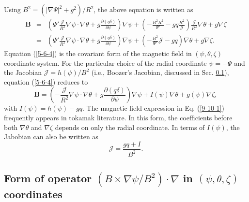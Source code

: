 \documentclass{llncs}
\begin{document}
Using $B^2 = (| \nabla \Psi |^2 + g^2) / R^2$, the above equation is written
as
\begin{eqnarray}
  \mathbf{B} & = & \left( \Psi' \frac{\mathcal{J}}{R^2} \nabla \psi \cdot
  \nabla \theta + g \frac{\partial (q \delta)}{\partial \psi} \right) \nabla
  \psi + \left( - \frac{B^2 R^2}{\Psi'} - g q \frac{R^2}{\mathcal{J}} \right)
  \frac{\mathcal{J}}{R^2} \nabla \theta + g \nabla \zeta \nonumber\\
  & = & \left( \Psi' \frac{\mathcal{J}}{R^2} \nabla \psi \cdot \nabla \theta
  + g \frac{\partial (q \delta)}{\partial \psi} \right) \nabla \psi + \left( -
  \frac{B^2}{\Psi'} \mathcal{J}- g q \right) \nabla \theta + g \nabla \zeta . 
  \label{5-6-4}
\end{eqnarray}
Equation (\ref{5-6-4}) is the covariant form of the magnetic field in $(\psi,
\theta, \zeta)$ coordinate system. For the particular choice of the radial
coordinate $\psi = - \Psi$ and the Jacobian $\mathcal{J}= h (\psi) / B^2$
(i.e., Boozer's Jacobian, discussed in Sec. \ref{18-5-1-p1}), equation
(\ref{5-6-4}) reduces to
\begin{equation}
  \label{9-10-1} \mathbf{B}= \left( - \frac{\mathcal{J}}{R^2} \nabla \psi
  \cdot \nabla \theta + g \frac{\partial (q \delta)}{\partial \psi} \right)
  \nabla \psi + I (\psi) \nabla \theta + g (\psi) \nabla \zeta,
\end{equation}
with $I (\psi) = h (\psi) - g q$. The magnetic field expression in Eq.
(\ref{9-10-1}) frequently appears in tokamak literature{\cite{white1984}}. In
this form, the coefficients before both $\nabla \theta$ and $\nabla \zeta$
depends on only the radial coordinate. In terms of $I (\psi)$, the Jabobian
can also be written as
\begin{equation}
  \mathcal{J} = \frac{g q + I}{B^2} .
\end{equation}


\subsection{Form of operator $(B \times \nabla \psi / B^2) \cdot \nabla$ in
$(\psi, \theta, \zeta)$ coordinates}\label{18-5-1-p1}
\end{document}
